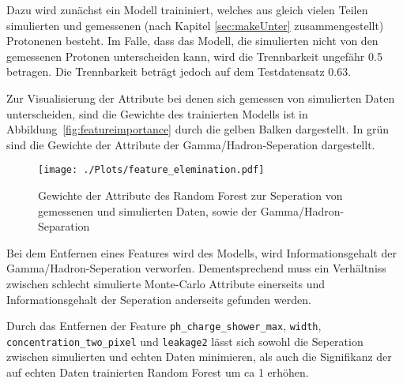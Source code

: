 Dazu wird zunächst ein Modell traininiert, welches aus gleich vielen Teilen simulierten und gemessenen (nach Kapitel \ref{sec:makeUnter} zusammengestellt) Protonenen besteht. 
Im Falle, dass das Modell, die simulierten nicht von den gemessenen Protonen unterscheiden kann, wird die Trennbarkeit ungefähr 0.5 betragen. 
Die Trennbarkeit beträgt jedoch auf dem Testdatensatz \num{0.63}. 

Zur Visualisierung der Attribute bei denen sich gemessen von simulierten Daten unterscheiden, sind die Gewichte des trainierten Modells ist in Abbildung~\ref{fig:featureimportance} durch die gelben Balken dargestellt. 
In grün sind die Gewichte der Attribute der Gamma/Hadron-Seperation dargestellt. 
\begin{figure}[H]
  \centering
  \texttt{[image: ./Plots/feature\_elemination.pdf]}
  \caption{Gewichte der Attribute des Random Forest zur Seperation von gemessenen und simulierten Daten, sowie der Gamma/Hadron-Separation }
\end{figure}
Bei dem Entfernen eines Features wird des Modells, wird Informationsgehalt der Gamma/Hadron-Seperation verworfen. 
Dementsprechend muss ein Verhältniss zwischen schlecht simulierte Monte-Carlo Attribute einerseits und Informationsgehalt der Seperation anderseits gefunden werden.

Durch das Entfernen der Feature \texttt{ph\_charge\_shower\_max}, \texttt{width}, \texttt{concentration\_two\_pixel} und \texttt{leakage2} lässt sich sowohl die Seperation zwischen simulierten und echten Daten minimieren, als auch die Signifikanz der auf echten Daten trainierten Random Forest um ca \SI{1}{\sigma} erhöhen.


